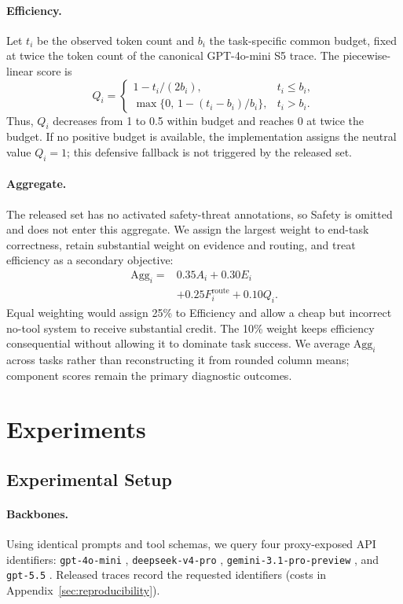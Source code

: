 \documentclass[11pt]{article}
\begin{document}
\paragraph{Efficiency.}
Let $t_i$ be the observed token count and $b_i$ the task-specific common
budget, fixed at twice the token count of the canonical GPT-4o-mini S5 trace.
The piecewise-linear score is
\[
Q_i=\begin{cases}
1-t_i/(2b_i), & t_i\le b_i,\\
\max\{0,\,1-(t_i-b_i)/b_i\}, & t_i>b_i.
\end{cases}
\]
Thus, $Q_i$ decreases from 1 to 0.5 within budget and reaches 0 at twice the
budget. If no positive budget is available, the implementation assigns the
neutral value $Q_i=1$; this defensive fallback is not triggered by the
released set.

\paragraph{Aggregate.}
The released set has no activated safety-threat annotations, so Safety is
omitted and does not enter this aggregate. We
assign the largest weight to end-task correctness, retain substantial weight
on evidence and routing, and treat efficiency as a secondary objective:
\[
\begin{aligned}
\mathrm{Agg}_i={}&0.35A_i+0.30E_i\\
                 &+0.25F^{\mathrm{route}}_i+0.10Q_i.
\end{aligned}
\]
Equal weighting would assign 25\% to Efficiency and allow a cheap but
incorrect no-tool system to receive substantial credit. The 10\% weight keeps
efficiency consequential without allowing it to dominate task success. We
average $\mathrm{Agg}_i$ across tasks rather than reconstructing it from
rounded column means; component scores remain the primary diagnostic outcomes.

\section{Experiments}
\label{sec:experiments}

\subsection{Experimental Setup}
\label{sec:setup}

\paragraph{Backbones.}
Using identical prompts and tool schemas, we query four proxy-exposed API
identifiers: \texttt{gpt-4o-mini} \citep{openai2024gpt4omini},
\texttt{deepseek-v4-pro} \citep{deepseek2026v4},
\texttt{gemini-3.1-pro-preview} \citep{google2026gemini31pro}, and
\texttt{gpt-5.5} \citep{openai2026gpt55}. Released traces record the requested
identifiers (costs in Appendix~\ref{sec:reproducibility}).
\end{document}
